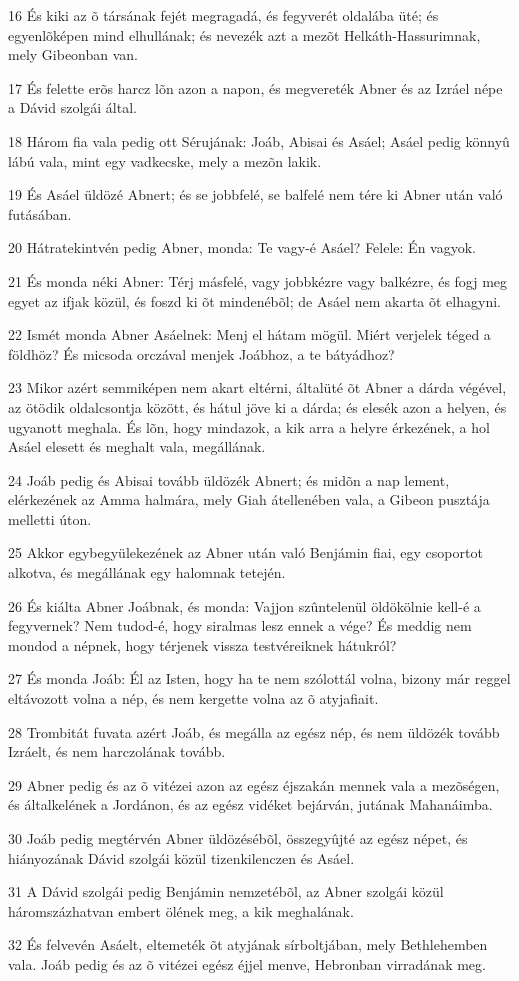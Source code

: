 \par 16 És kiki az õ társának fejét megragadá, és fegyverét oldalába üté; és egyenlõképen mind elhullának; és nevezék azt a mezõt Helkáth-Hassurimnak, mely Gibeonban van.
\par 17 És felette erõs harcz lõn azon a napon, és megvereték Abner és az Izráel népe a Dávid szolgái által.
\par 18 Három fia vala pedig ott Sérujának: Joáb,  Abisai és Asáel; Asáel pedig könnyû lábú vala, mint egy vadkecske, mely a mezõn lakik.
\par 19 És Asáel üldözé Abnert; és se jobbfelé, se balfelé nem tére ki Abner után való futásában.
\par 20 Hátratekintvén pedig Abner, monda: Te vagy-é Asáel? Felele: Én vagyok.
\par 21 És monda néki Abner: Térj másfelé, vagy jobbkézre vagy balkézre, és fogj meg egyet az ifjak közül, és foszd ki õt mindenébõl; de Asáel nem akarta õt elhagyni.
\par 22 Ismét monda Abner Asáelnek: Menj el hátam mögül. Miért verjelek téged a földhöz? És micsoda orczával menjek Joábhoz, a te bátyádhoz?
\par 23 Mikor azért semmiképen nem akart eltérni, általüté õt Abner a dárda végével, az ötödik oldalcsontja között, és hátul jöve ki a dárda; és elesék azon a helyen, és ugyanott meghala. És lõn, hogy mindazok, a kik arra a helyre érkezének, a hol Asáel elesett és meghalt vala, megállának.
\par 24 Joáb pedig és Abisai tovább üldözék Abnert; és midõn a nap lement, elérkezének az Amma halmára, mely Giah átellenében vala, a Gibeon pusztája melletti úton.
\par 25 Akkor egybegyülekezének az Abner után való Benjámin fiai, egy csoportot alkotva, és megállának egy halomnak tetején.
\par 26 És kiálta Abner Joábnak, és monda: Vajjon szûntelenül öldökölnie kell-é a fegyvernek? Nem tudod-é, hogy siralmas lesz ennek a vége? És meddig nem mondod a népnek, hogy térjenek vissza testvéreiknek hátukról?
\par 27 És monda Joáb: Él az Isten, hogy ha te nem szólottál volna, bizony már reggel eltávozott volna a nép, és nem kergette volna az õ atyjafiait.
\par 28 Trombitát fuvata azért Joáb, és megálla az egész nép, és nem üldözék tovább Izráelt, és nem harczolának tovább.
\par 29 Abner pedig és az õ vitézei azon az egész éjszakán mennek vala a mezõségen, és általkelének a Jordánon, és az egész vidéket bejárván, jutának Mahanáimba.
\par 30 Joáb pedig megtérvén Abner üldözésébõl, összegyûjté az egész népet, és hiányozának Dávid szolgái közül tizenkilenczen és Asáel.
\par 31 A Dávid szolgái pedig Benjámin nemzetébõl, az Abner szolgái közül háromszázhatvan embert ölének meg, a kik meghalának.
\par 32 És felvevén Asáelt, eltemeték õt atyjának sírboltjában, mely Bethlehemben vala. Joáb pedig és az õ vitézei egész éjjel menve, Hebronban virradának meg.

